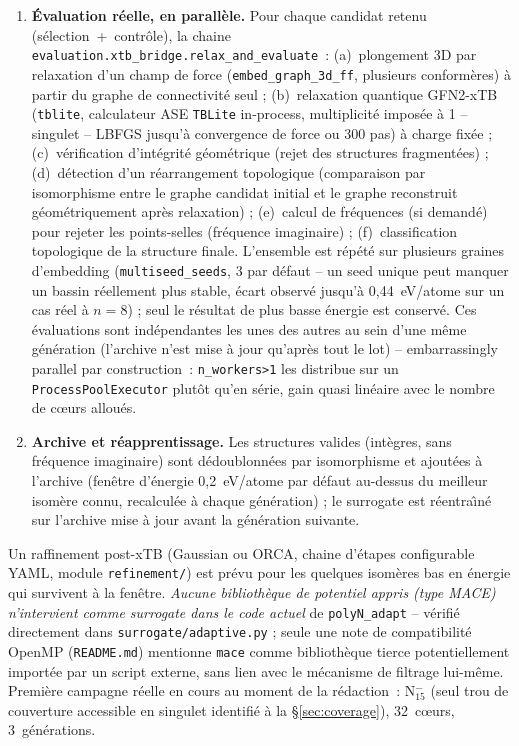 \documentclass[11pt,a4paper]{article}
\begin{document}
\begin{description}[leftmargin=1.2em,style=nextline]
\begin{enumerate}[leftmargin=1.4em]
\item \textbf{\'Evaluation r\'eelle, en parall\`ele.} Pour chaque candidat
retenu (s\'election~+~contr\^ole), la chaine
\texttt{evaluation.xtb\_bridge.relax\_and\_evaluate}~: (a)~plongement 3D
par relaxation d'un champ de force
(\texttt{embed\_graph\_3d\_ff}, plusieurs conform\`eres) \`a partir du
graphe de connectivit\'e seul ; (b)~relaxation quantique GFN2-xTB
(\texttt{tblite}, calculateur ASE \texttt{TBLite} in-process,
multiplicit\'e impos\'ee \`a 1 -- singulet -- LBFGS jusqu'\`a
convergence de force ou 300 pas) \`a charge fix\'ee ; (c)~v\'erification
d'int\'egrit\'e g\'eom\'etrique (rejet des structures fragment\'ees) ;
(d)~d\'etection d'un r\'earrangement topologique (comparaison par
isomorphisme entre le graphe candidat initial et le graphe reconstruit
g\'eom\'etriquement apr\`es relaxation) ; (e)~calcul de fr\'equences
(si demand\'e) pour rejeter les points-selles (fr\'equence imaginaire) ;
(f)~classification topologique de la structure finale. L'ensemble est
r\'ep\'et\'e sur plusieurs graines d'embedding (\texttt{multiseed\_seeds},
3 par d\'efaut -- un seed unique peut manquer un bassin r\'eellement plus
stable, \'ecart observ\'e jusqu'\`a 0,44~eV/atome sur un cas r\'eel \`a
$n=8$) ; seul le r\'esultat de plus basse \'energie est conserv\'e.
Ces \'evaluations sont ind\'ependantes les unes des autres au sein d'une
m\^eme g\'en\'eration (l'archive n'est mise \`a jour qu'apr\`es tout le
lot) -- embarrassingly parallel par construction~:
\texttt{n\_workers>1} les distribue sur un \texttt{ProcessPoolExecutor}
plut\^ot qu'en s\'erie, gain quasi lin\'eaire avec le nombre de c\oe urs
allou\'es.
\item \textbf{Archive et r\'eapprentissage.} Les structures valides
(int\`egres, sans fr\'equence imaginaire) sont d\'edoublonn\'ees par
isomorphisme et ajout\'ees \`a l'archive (fen\^etre d'\'energie 0,2~eV/atome
par d\'efaut au-dessus du meilleur isom\`ere connu, recalcul\'ee \`a
chaque g\'en\'eration) ; le surrogate est r\'eentra\^\i n\'e sur
l'archive mise \`a jour avant la g\'en\'eration suivante.
\end{enumerate}
Un raffinement post-xTB (Gaussian ou ORCA, chaine d'\'etapes configurable
YAML, module \texttt{refinement/}) est pr\'evu pour les quelques
isom\`eres bas en \'energie qui survivent \`a la fen\^etre. \emph{Aucune
biblioth\`eque de potentiel appris (type MACE) n'intervient comme
surrogate dans le code actuel} de \texttt{polyN\_adapt} -- v\'erifi\'e
directement dans \texttt{surrogate/adaptive.py} ; seule une note de
compatibilit\'e OpenMP (\texttt{README.md}) mentionne \texttt{mace} comme
biblioth\`eque tierce potentiellement import\'ee par un script externe,
sans lien avec le m\'ecanisme de filtrage lui-m\^eme. Premi\`ere campagne
r\'eelle en cours au moment de la r\'edaction~: N$_{15}^-$ (seul trou de
couverture accessible en singulet identifi\'e \`a la
\S\ref{sec:coverage}), 32~c\oe urs, 3~g\'en\'erations.


\end{description}
\end{document}
